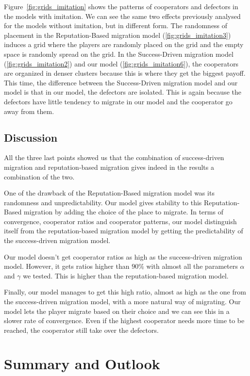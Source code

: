 \documentclass[11pt]{article}
\begin{document}
Figure~\ref{fig:grids_imitation} shows the patterns of cooperators and defectors in the models with imitation. We can see the same two effects previously analysed for the models without imitation, but in different form.
The randomness of placement in the Reputation-Based migration model (\ref{fig:grids_imitation3}) induces a grid where the players are randomly placed on the grid and the empty space is randomly spread on the grid. In the Success-Driven migration model (\ref{fig:grids_imitation2}) and our model (\ref{fig:grids_imitation6}), the cooperators are organized in denser clusters because this is where they get the biggest payoff.
This time, the difference between the Success-Driven migration model and our model is that in our model, the defectors are isolated. This is again because the defectors have little tendency to migrate in our model and the cooperator go away from them.

\subsection{Discussion}

All the three last points showed us that the combination of success-driven migration and reputation-based migration gives indeed in the results a combination of the two.

One of the drawback of the Reputation-Based migration model was its randomness and unpredictability. Our model gives stability to this Reputation-Based migration by adding the choice of the place to migrate. In terms of convergence, cooperator ratios and cooperator patterns, our model distinguish itself from the reputation-based migration model by getting the predictability of the success-driven migration model.

Our model doesn't get cooperator ratios as high as the success-driven migration model. However, it gets ratios higher than $90\%$ with almost all the parameters $\alpha$ and $\gamma$ we tested. This is higher than the reputation-based migration model.

Finally, our model manages to get this high ratio, almost as high as the one from the success-driven migration model, with a more natural way of migrating. Our model lets the player migrate based on their choice and we can see this in a slower rate of convergence. Even if the highest cooperator needs more time to be reached, the cooperator still take over the defectors.


\section{Summary and Outlook}
\end{document}
